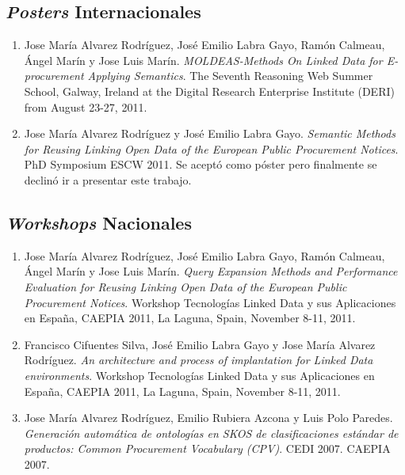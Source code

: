 \subsection{\textit{Posters} Internacionales}

\begin{enumerate}
\item Jose María Alvarez Rodríguez, José Emilio Labra Gayo, Ramón Calmeau, Ángel Marín y Jose Luis Marín. 
\textit{MOLDEAS-Methods On Linked Data for E-procurement Applying Semantics}. The Seventh Reasoning Web Summer School, Galway, 
Ireland at the Digital Research Enterprise Institute (DERI) from August 23-27, 2011.

\item Jose María Alvarez Rodríguez y José Emilio Labra Gayo. \textit{Semantic Methods for Reusing Linking Open Data of the European Public Procurement Notices}.
PhD Symposium ESCW 2011. Se aceptó como póster pero finalmente se declinó ir a presentar este trabajo.

\end{enumerate}


\subsection{\textit{Workshops} Nacionales}

\begin{enumerate}
\item Jose María Alvarez Rodríguez, José Emilio Labra Gayo, Ramón Calmeau, Ángel Marín y Jose Luis Marín. \textit{Query Expansion Methods and Performance Evaluation for Reusing Linking 
Open Data of the European Public Procurement Notices}. Workshop Tecnologías Linked Data y sus Aplicaciones en España, 
CAEPIA 2011, La Laguna, Spain, November 8-11, 2011.

\item Francisco Cifuentes Silva, José Emilio Labra Gayo y Jose María Alvarez Rodríguez. \textit{An architecture and process of 
implantation for Linked Data environments}. Workshop Tecnologías Linked Data y sus Aplicaciones en España, CAEPIA 2011, 
La Laguna, Spain, November 8-11, 2011.

\item Jose María Alvarez Rodríguez, Emilio Rubiera Azcona y Luis Polo Paredes. \textit{Generación automática de ontologías en SKOS de 
clasificaciones estándar de productos: Common Procurement Vocabulary (CPV)}. CEDI 2007. CAEPIA 2007.

\end{enumerate}


